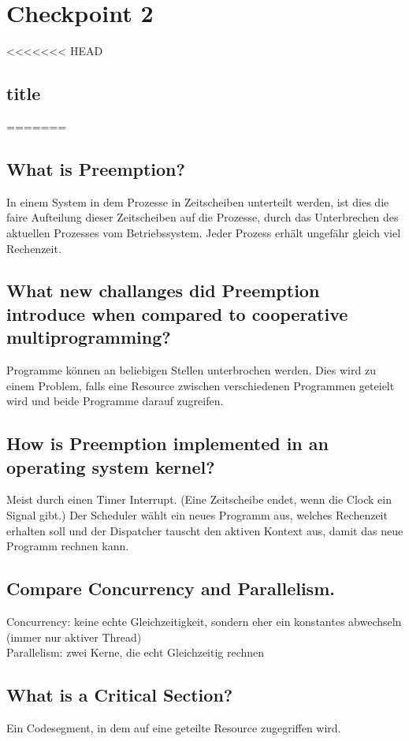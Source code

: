\section{Checkpoint 2}

<<<<<<< HEAD
\subsection{title}
=======
\addtocounter{subsection}{1}

\subsection{What is Preemption?}
In einem System in dem Prozesse in Zeitscheiben unterteilt werden, ist dies die faire Aufteilung dieser Zeitscheiben auf die Prozesse, durch das Unterbrechen des aktuellen Prozesses vom Betriebssystem.
Jeder Prozess erhält ungefähr gleich viel Rechenzeit.

\subsection{What new challanges did Preemption introduce when compared to cooperative multiprogramming?}
Programme können an beliebigen Stellen unterbrochen werden.
Dies wird zu einem Problem, falls eine Resource zwischen verschiedenen Programmen geteielt wird und beide Programme darauf zugreifen.

\subsection{How is Preemption implemented in an operating system kernel?}
Meist durch einen Timer Interrupt. (Eine Zeitscheibe endet, wenn die Clock ein Signal gibt.)
Der Scheduler wählt ein neues Programm aus, welches Rechenzeit erhalten soll und der Dispatcher tauscht den aktiven Kontext aus, damit das neue Programm rechnen kann.

\subsection{Compare Concurrency and Parallelism.}
Concurrency: keine echte Gleichzeitigkeit, sondern eher ein konstantes abwechseln (immer nur aktiver Thread)\\
Parallelism: zwei Kerne, die echt Gleichzeitig rechnen

\subsection{What is a Critical Section?}
Ein Codesegment, in dem auf eine geteilte Resource zugegriffen wird.

